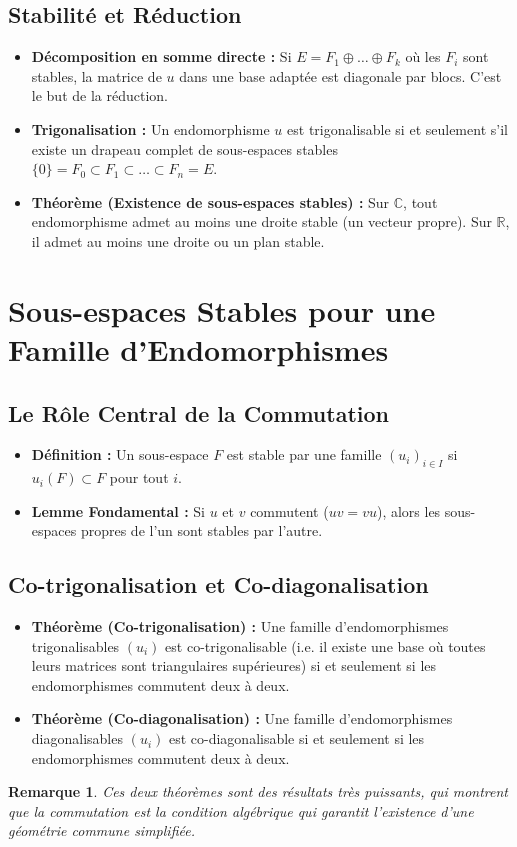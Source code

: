 \documentclass[12pt, a4paper, parskip=full]{report}
\theoremstyle{agregstyle}
\newtheorem{remark}[definition]{Remarque}
\begin{document}
\subsection{Stabilité et Réduction}
\begin{itemize}
    \item \textbf{Décomposition en somme directe :} Si $E = F_1 \oplus \dots \oplus F_k$ où les $F_i$ sont stables, la matrice de $u$ dans une base adaptée est diagonale par blocs. C'est le but de la réduction.
    \item \textbf{Trigonalisation :} Un endomorphisme $u$ est trigonalisable si et seulement s'il existe un drapeau complet de sous-espaces stables $\{0\} = F_0 \subset F_1 \subset \dots \subset F_n = E$.
    \item \textbf{Théorème (Existence de sous-espaces stables) :} Sur $\mathbb{C}$, tout endomorphisme admet au moins une droite stable (un vecteur propre). Sur $\mathbb{R}$, il admet au moins une droite ou un plan stable.
\end{itemize}

\section{Sous-espaces Stables pour une Famille d'Endomorphismes}

\subsection{Le Rôle Central de la Commutation}
\begin{itemize}
    \item \textbf{Définition :} Un sous-espace $F$ est stable par une famille $(u_i)_{i \in I}$ si $u_i(F) \subset F$ pour tout $i$.
    \item \textbf{Lemme Fondamental :} Si $u$ et $v$ commutent ($uv=vu$), alors les sous-espaces propres de l'un sont stables par l'autre.
\end{itemize}

\subsection{Co-trigonalisation et Co-diagonalisation}
\begin{itemize}
    \item \textbf{Théorème (Co-trigonalisation) :} Une famille d'endomorphismes trigonalisables $(u_i)$ est co-trigonalisable (i.e. il existe une base où toutes leurs matrices sont triangulaires supérieures) si et seulement si les endomorphismes commutent deux à deux.
    \item \textbf{Théorème (Co-diagonalisation) :} Une famille d'endomorphismes diagonalisables $(u_i)$ est co-diagonalisable si et seulement si les endomorphismes commutent deux à deux.
\end{itemize}
\begin{remark}
    Ces deux théorèmes sont des résultats très puissants, qui montrent que la commutation est la condition algébrique qui garantit l'existence d'une géométrie commune simplifiée.
\end{remark}
\end{document}
